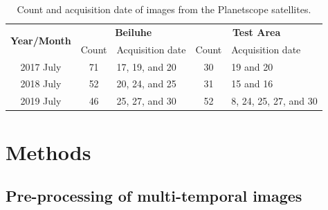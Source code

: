 \documentclass[authoryear,preprint,review,12pt]{elsarticle}
\begin{document}
\begin{table}[ht]
\footnotesize
\caption{Count and acquisition date of images from the Planetscope satellites.}
\label{table_image_list}
\centering
\begin{tabular}{c  c  m{2.5cm}   c m{3.0cm} }
\toprule
 \multirow{2}{*}{ \textbf{Year/Month}}  & \multicolumn{2}{c}{ \textbf{Beiluhe}} &  \multicolumn{2}{c}{ \textbf{Test Area}}\\
 & Count & Acquisition date & Count & Acquisition date \\
\midrule
 2017 July & 71 & 17, 19, and 20 & 30 & 19 and 20 \\
 2018 July & 52 & 20, 24, and 25 & 31 & 15 and 16 \\
 2019 July & 46 & 25, 27, and 30 & 52 &  8, 24, 25, 27, and 30\\

\bottomrule
\end{tabular}

\end{table}


\section{Methods}
\label{sec_meth}



\subsection{Pre-processing of multi-temporal images}
\label{sec_preprocessing}
\end{document}
